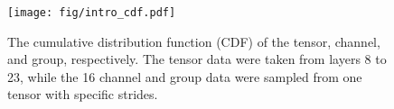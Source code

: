 \begin{figure}[t] 
    \centering 
    \texttt{[image: fig/intro\_cdf.pdf]}  
    \caption{The cumulative distribution function (CDF) of the tensor, channel, and group, respectively. The tensor data were taken from layers 8 to 23, while the 16 channel and group data were sampled from one tensor with specific strides.}\label{fig:moti_dist} 
\end{figure}